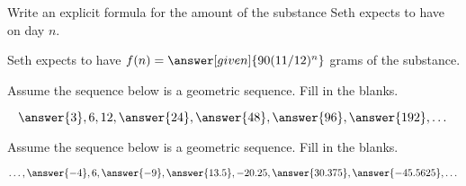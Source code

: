 \documentclass[nooutcomes]{ximera}
\begin{document}
\begin{problem}
\begin{problem}
\begin{problem}
\begin{problem}
\begin{problem}
Write an explicit formula for the amount of the substance Seth expects to have on day $n$.
\begin{prompt}
Seth expects to have $f(n) = \answer[given]{90(11/12)^n}$ grams of the substance.
\end{prompt}

\end{problem}
\end{problem}
\end{problem}
\end{problem}
\end{problem}



\begin{problem}
Assume the sequence below is a geometric sequence.  Fill in the blanks.

\[
\answer{3}, 6, 12, \answer{24}, \answer{48}, \answer{96}, \answer{192}, \dots
\]

\end{problem}




\begin{problem}
Assume the sequence below is a geometric sequence.  Fill in the blanks.

\[
\dots, \answer{-4}, 6, \answer{-9}, \answer{13.5}, -20.25, \answer{30.375}, \answer{-45.5625}, \dots
\]

\end{problem}




%
%
\end{document}
